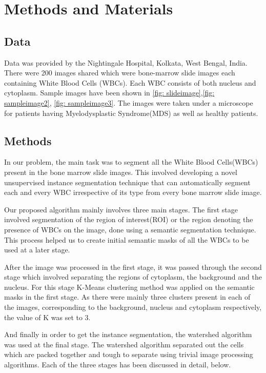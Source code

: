 \documentclass[conference]{IEEEtran}
\begin{document}


\section{Methods and Materials}

\subsection{Data}
Data was provided by the Nightingale Hospital, Kolkata, West Bengal, India. There were 200 images shared which were bone-marrow slide images each containing White Blood Cells (WBCs). Each WBC consists of both nucleus and cytoplasm. Sample images have been shown in \ref{fig: slideimage},\ref{fig:  sampleimage2}, \ref{fig:  sampleimage3}. The images were taken under a microscope for patients having Myelodysplastic Syndrome(MDS) as well as healthy patients.

\subsection{Methods}
In our problem, the main task was to segment all the White Blood Cells(WBCs) 
 present in the bone marrow slide images. This involved developing a novel unsupervised instance segmentation technique that can automatically segment each and every WBC irrespective of its type from every bone marrow slide image. 

Our proposed algorithm mainly involves three main stages. The first stage involved segmentation of the region of interest(ROI) or the region denoting the presence of WBCs on the image, done using a semantic segmentation technique. This process helped us to create initial semantic masks of all the WBCs to be used at a later stage. 

After the image was processed in the first stage, it was passed through the second stage which involved separating the regions of cytoplasm, the background and the nucleus. For this stage K-Means clustering method was applied on the semantic masks in the first stage. As there were mainly three clusters present in each of the images, corresponding to the background, nucleus and cytoplasm respectively, the value of K was set to 3. 

And finally in order to get the instance segmentation, the watershed algorithm was used at the final stage. The watershed algorithm separated out the cells which are packed together and tough to separate using trivial image processing algorithms. Each of the  three stages has been discussed in detail, below.
\end{document}
